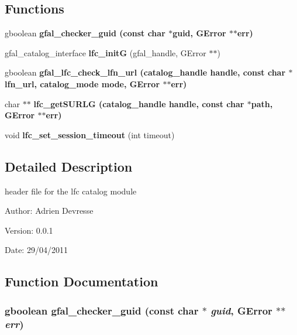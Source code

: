 \subsection*{Functions}
\begin{CompactItemize}
\item 
gboolean \bf{gfal\_\-checker\_\-guid} (const char $\ast$guid, GError $\ast$$\ast$err)
\item 
gfal\_\-catalog\_\-interface \textbf{lfc\_\-init\-G} (gfal\_\-handle, GError $\ast$$\ast$)\label{gfal__common__lfc_8h_0d4af55002fa4216f9915b5a1a721ef4}

\item 
gboolean \bf{gfal\_\-lfc\_\-check\_\-lfn\_\-url} (catalog\_\-handle handle, const char $\ast$lfn\_\-url, catalog\_\-mode mode, GError $\ast$$\ast$err)
\item 
char $\ast$$\ast$ \bf{lfc\_\-get\-SURLG} (catalog\_\-handle handle, const char $\ast$path, GError $\ast$$\ast$err)
\item 
void \textbf{lfc\_\-set\_\-session\_\-timeout} (int timeout)\label{gfal__common__lfc_8h_656ee4eb29a1bcf4e9e1d9a4aafd4c82}

\end{CompactItemize}


\subsection{Detailed Description}
header file for the lfc catalog module 

\begin{Desc}
\item[Author:]Adrien Devresse \end{Desc}
\begin{Desc}
\item[Version:]0.0.1 \end{Desc}
\begin{Desc}
\item[Date:]29/04/2011 \end{Desc}


\subsection{Function Documentation}
\subsubsection{\setlength{\rightskip}{0pt plus 5cm}gboolean gfal\_\-checker\_\-guid (const char $\ast$ {\em guid}, GError $\ast$$\ast$ {\em err})}\label{gfal__common__lfc_8h_c7f9448e809d5c82f58288d1491dc2d0}


